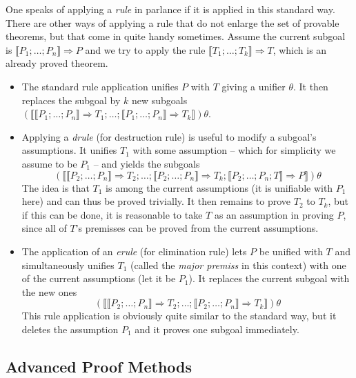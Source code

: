 One speaks of applying a \emph{rule} in \Isabelle parlance if it is applied in
this standard way. There are other ways of applying a rule that do not enlarge
the set of provable theorems, but that come in quite handy sometimes. Assume the
current subgoal is $\llbracket P_1;\ldots;P_n\rrbracket \Longrightarrow P$ and we try to apply the rule $\llbracket T_1;\ldots;T_k\rrbracket \Longrightarrow
T$, which is an already proved theorem.
\begin{itemize}
\item  The standard rule application unifies $P$ with $T$ giving a unifier $\theta$. It
  then replaces the subgoal by $k$ new subgoals $(\llbracket \llbracket P_1;\ldots;P_n\rrbracket \Longrightarrow T_1; \ldots;
  \llbracket P_1;\ldots;P_n\rrbracket \Longrightarrow T_k\rrbracket)\theta$. 
\item Applying a \emph{drule} (for destruction rule) is useful to modify a
  subgoal's assumptions. It unifies $T_1$ with some assumption -- which for
  simplicity we assume to be $P_1$ -- and yields the subgoals 
  \[(\llbracket \llbracket P_2;\ldots;P_n\rrbracket \Longrightarrow
  T_2; \ldots; \llbracket P_2;\ldots;P_n\rrbracket \Longrightarrow T_k; \llbracket P_2; \ldots; P_n; T\rrbracket \Longrightarrow P\rrbracket)\theta\] 
  The idea is that $T_1$ is among the current assumptions (it is unifiable with
  $P_1$ here) and can thus be proved trivially. It then remains to prove $T_2$
  to $T_k$, but if this can be done, it is reasonable to take $T$ as an
  assumption in proving $P$, since all of $T$'s premisses can be proved from the
  current assumptions. 

\item The application of an \emph{erule} (for elimination rule) lets $P$ be
  unified with $T$ and simultaneously unifies $T_1$ (called the \emph{major
    premiss} in this context) with one of the current assumptions (let it be
  $P_1$). It replaces the current subgoal with the new ones
  \[ (\llbracket \llbracket P_2;\ldots;P_n\rrbracket \Longrightarrow T_2; \ldots; \llbracket P_2;\ldots;P_n\rrbracket \Longrightarrow T_k\rrbracket)\theta \]
  This rule application is obviously quite similar to the standard way, but it
  deletes the assumption $P_1$ and it proves one subgoal immediately.
\end{itemize}

\subsection{Advanced Proof Methods}
\label{sec:adv-proof-meth}

